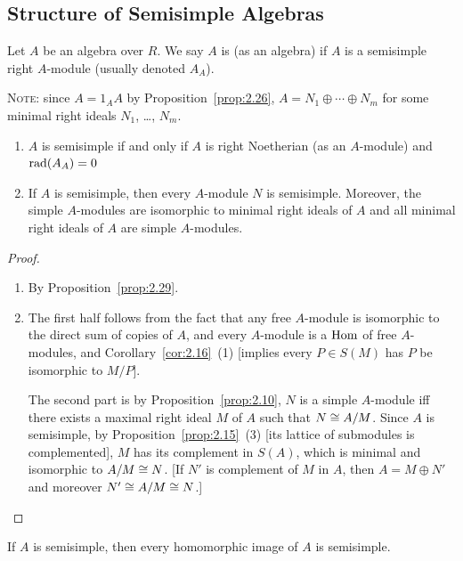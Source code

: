 \subsection{Structure of Semisimple Algebras}

\begin{definition}\label{defn:3.1}
Let $A$ be an algebra over $R$. We say $A$ is  (as
an algebra) if $A$ is a semisimple right $A$-module (usually denoted $A_{A}$).

\textsc{Note}: since $A=1_{A}A$ by Proposition~\ref{prop:2.26},
$A=N_{1}\oplus\cdots\oplus N_{m}$ for some minimal right ideals
$N_{1}$, \dots, $N_{m}$.
\end{definition}

\begin{proposition}\label{prop:3.2}
\begin{enumerate}
\item $A$ is semisimple if and only if $A$ is right Noetherian (as an
  $A$-module) and $\operatorname{rad}(A_{A})=0$
\item If $A$ is semisimple, then every $A$-module $N$ is
  semisimple. Moreover, the simple $A$-modules are isomorphic to
  minimal right ideals of $A$ and all minimal right ideals of $A$ are
  simple $A$-modules.
\end{enumerate}
\end{proposition}

\begin{proof}
\begin{enumerate}
\item By Proposition~\ref{prop:2.29}.
\item The first half follows from the fact that any free $A$-module is
  isomorphic to the direct sum of copies of $A$, and every $A$-module
  is a $\operatorname{Hom}$ of free $A$-modules, and Corollary~\ref{cor:2.16}~(1)
  [implies every $P\in S(M)$ has $P$ be isomorphic to $M/P$].

The second part is by Proposition~\ref{prop:2.10}, $N$ is a simple
$A$-module iff there exists a maximal right ideal $M$ of $A$ such that
$N\cong A/M$. Since $A$ is semisimple, by
Proposition~\ref{prop:2.15}~(3) [its lattice of submodules is
  complemented], $M$ has its complement in $S(A)$, which is minimal
and isomorphic to $A/M\cong N$. [If $N'$ is complement of $M$ in $A$,
  then $A=M\oplus N'$ and moreover $N'\cong A/M\cong N$.]\qedhere
\end{enumerate}
\end{proof}

\begin{corollary}\label{cor:3.3}
If $A$ is semisimple, then every homomorphic image of $A$ is semisimple.
\end{corollary}

